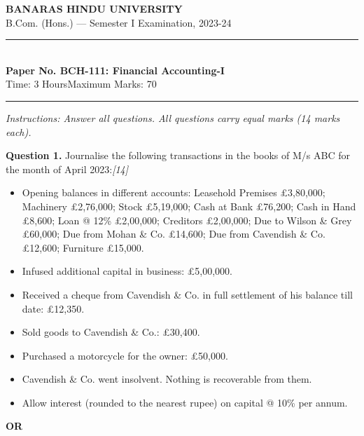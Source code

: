 \documentclass[11pt,a4paper]{article}
\newcommand{\pts}[1]{\hfill   \textit{[#1]}}
\begin{document}
\begin{center}
  {\large\bfseries BANARAS HINDU UNIVERSITY}\\[2pt]
  {\normalsize B.Com. (Hons.) --- Semester I Examination, 2023-24}\\[6pt]
  \rule{0.8\linewidth}{0.5pt}\\[6pt]
  {\large\bfseries Paper No. BCH-111: Financial Accounting-I}\\[4pt]
  {\normalsize Time: 3 Hours\hfill Maximum Marks: 70}
\end{center}

\rule{\linewidth}{0.4pt}

\smallskip



\noindent   \textit{Instructions: Answer all questions. All questions carry equal marks (14 marks each).}

\bigskip




\noindent   \textbf{Question 1.}
Journalise the following transactions in the books of M/s ABC for the month of April 2023:\pts{14}

\begin{itemize}[itemsep=2pt,topsep=2pt]
  \item[April 1:] Opening balances in different accounts: Leasehold Premises \pounds 3,80,000; Machinery \pounds 2,76,000; Stock \pounds 5,19,000; Cash at Bank \pounds 76,200; Cash in Hand \pounds 8,600; Loan @ 12\% \pounds 2,00,000; Creditors \pounds 2,00,000; Due to Wilson \& Grey \pounds 60,000; Due from Mohan \& Co. \pounds 14,600; Due from Cavendish \& Co. \pounds 12,600; Furniture \pounds 15,000.
  \item[April 1:] Infused additional capital in business: \pounds 5,00,000.
  \item[April 5:] Received a cheque from Cavendish \& Co. in full settlement of his balance till date: \pounds 12,350.
  \item[April 10:] Sold goods to Cavendish \& Co.: \pounds 30,400.
  \item[April 18:] Purchased a motorcycle for the owner: \pounds 50,000.
  \item[April 25:] Cavendish \& Co. went insolvent. Nothing is recoverable from them.
  \item[April 30:] Allow interest (rounded to the nearest rupee) on capital @ 10\% per annum.
\end{itemize}

\centerline{   \textbf{OR}}
\end{document}
